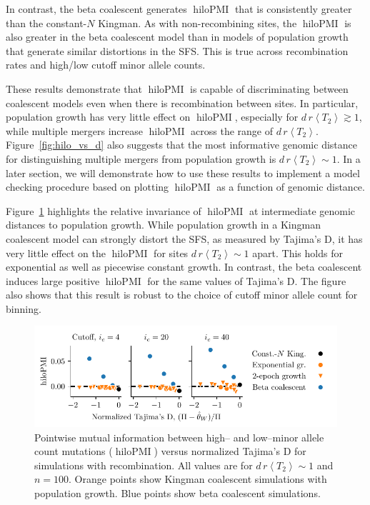 \documentclass[11pt, letterpaper]{article}   	%
\newcommand{\Fig}[1]{Figure~\ref{#1}}
\newcommand{\E}[1]{\left< #1 \right>}
\DeclareMathOperator{\hilopmi}{hiloPMI}
\begin{document}
In contrast, the beta coalescent generates $\hilopmi$ that is consistently greater than the constant-$N$ Kingman.
As with non-recombining sites, the $\hilopmi$ is also greater in the beta coalescent model than in models of population growth that generate similar distortions in the SFS.
This is true across recombination rates and high/low cutoff minor allele counts.

These results demonstrate that $\hilopmi$ is capable of discriminating between coalescent models even when there is recombination between sites.
In particular, population growth has very little effect on $\hilopmi$, especially for $d\,r \E{T_2} \gtrsim 1$, while multiple mergers increase $\hilopmi$ across the range of $d\,r \E{T_2}$.
\Fig{fig:hilo_vs_d} also suggests that the most informative genomic distance for distinguishing multiple mergers from population growth is $d\,r \E{T_2} \sim 1$.
In a later section, we will demonstrate how to use these results to implement a model checking procedure based on plotting $\hilopmi$ as a function of genomic distance.

\Fig{fig:hilo_vs_tajD} highlights the relative invariance of $\hilopmi$ at intermediate genomic distances to population growth.
While population growth in a Kingman coalescent model can strongly distort the SFS, as measured by Tajima's D, it has very little effect on the $\hilopmi$ for sites $d\,r \E{T_2} \sim 1$ apart.
This holds for exponential as well as piecewise constant growth.
In contrast, the beta coalescent induces large positive $\hilopmi$ for the same values of Tajima's D.
The figure also shows that this result is robust to the choice of cutoff minor allele count for binning.

\begin{figure}
\centering
\includegraphics[scale=1]{figures/hilopmi_vs_tajimasD_recombination.pdf}
\caption{Pointwise mutual information between high-- and low--minor allele count mutations ($\hilopmi$) versus normalized Tajima's D for simulations with recombination. All values are for $d\,r \E{T_2} \sim 1$ and $n=100$. Orange points show Kingman coalescent simulations with population growth. Blue points show beta coalescent simulations. \label{fig:hilo_vs_tajD}}
\end{figure}
\end{document}
